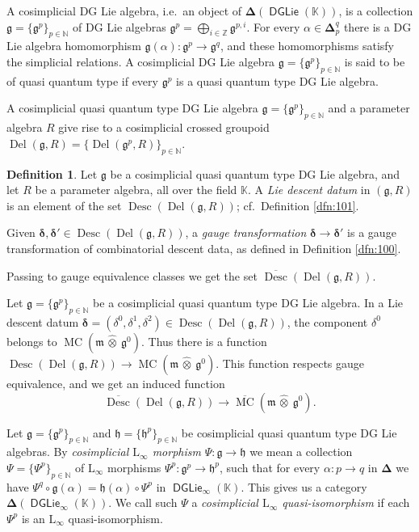 \documentclass[a4paper, 10pt]{amsart}
\theoremstyle{definition}
\newtheorem{dfn}[equation]{Definition}
\numberwithin{equation}{section}
\newcommand{\opn}{\operatorname}
\newcommand{\cat}[1]{\operatorname{\mathsf{#1}}}
\newcommand{\ol}{\overline}
\newcommand{\mfrak}[1]{\mathfrak{#1}}
\newcommand{\mrm}[1]{\mathrm{#1}}
\newcommand{\mbb}[1]{\mathbb{#1}}
\newcommand{\bsym}[1]{\boldsymbol{#1}}
\newcommand{\hatotimes}[1]{\, \what{{\otimes}}_{#1} \,}
\newcommand{\hot}{\hatotimes{}}
\newcommand{\what}[1]{\widehat{#1}}
\newcommand{\K}{\mbb{K}}
\newcommand{\g}{\mfrak{g}}
\newcommand{\m}{\mfrak{m}}
\newcommand{\h}{\mfrak{h}}
\newcommand{\al}{\alpha}
\newcommand{\de}{\delta}
\begin{document}
 A cosimplicial DG Lie algebra, i.e.\ an object of
$\bsym{\Delta}(\cat{DGLie} (\K))$, is  a collection
$\g = \{ \mfrak{g}^{p} \}_{p \in \mbb{N}}$
of DG Lie algebras
$\mfrak{g}^{p} = \bigoplus_{i \in \mbb{Z}} \mfrak{g}^{p, i}$.
For every $\alpha \in \bsym{\Delta}^q_p$
there is a DG Lie algebra homomorphism 
$\g(\alpha) : \mfrak{g}^{p} \to \mfrak{g}^{q}$,
and these homomorphisms satisfy the simplicial relations.
A cosimplicial DG Lie algebra 
$\g = \{ \mfrak{g}^{p} \}_{p \in \mbb{N}}$ is said to be of quasi quantum type
if every $\g^p$ is a  quasi quantum type DG Lie algebra.

A cosimplicial quasi quantum type DG Lie algebra 
$\g = \{ \mfrak{g}^{p} \}_{p \in \mbb{N}}$ and a parameter algebra $R$
give rise to a cosimplicial crossed groupoid 
$\opn{Del}(\g, R) = \bigl\{ \opn{Del}(\g^p, R)  
\bigr\}_{p \in \mbb{N}}$.

\begin{dfn} \label{dfn:Lie-desc.102}
Let $\g$ be a cosimplicial quasi quantum type DG Lie algebra, and let $R$ be a
parameter algebra, all over the field $\K$. 
A {\em Lie descent datum} in $(\g, R)$ is an element of the set 
$\opn{Desc}(\opn{Del}(\g, R))$;
cf.\ Definition \ref{dfn:101}.

Given 
$\bsym{\de}, \bsym{\de}' \in \opn{Desc}(\opn{Del}(\g, R))$,
a {\em gauge transformation} $\bsym{\delta} \to \bsym{\delta}'$ is 
a gauge transformation of combinatorial descent data, as defined in
Definition \ref{dfn:100}.

Passing to gauge equivalence classes we get the set
$\ol{\opn{Desc}}(\opn{Del}(\g, R))$.
\end{dfn}

Let $\g = \{ \mfrak{g}^{p} \}_{p \in \mbb{N}} $ be a cosimplicial quasi quantum
type DG Lie algebra. In a Lie descent datum 
$\bsym{\de} = (\de^0, \de^1, \de^2) \in \opn{Desc}(\opn{Del}(\g, R))$,
the component $\de^0$ belongs to $\opn{MC}(\m \hot \g^0)$.
Thus there is a function 
$\opn{Desc}(\opn{Del}(\g, R)) \to \opn{MC}(\m \hot \g^0)$.
This function respects gauge equivalence, and we get an induced function 
\begin{equation} \label{eqn:Lie-desc.105}
\ol{\opn{Desc}}(\opn{Del}(\g, R)) \to \ol{\opn{MC}}(\m \hot \g^0) .
\end{equation}

Let $\g = \{ \mfrak{g}^{p} \}_{p \in \mbb{N}}$ and 
$\h = \{ \mfrak{h}^{p} \}_{p \in \mbb{N}}$ 
be cosimplicial  quasi quantum type DG Lie algebras. By {\em cosimplicial 
$\mrm{L}_{\infty}$ morphism} 
$\Psi : \g \to \h$ we mean a collection 
$\Psi = \{ \Psi^{p} \}_{p \in \mbb{N}}$
of $\mrm{L}_{\infty}$ morphisms $\Psi^p : \g^p \to \h^p$, 
such that for every $\al : p \to q$ in $\bsym{\Delta}$ we have 
$\Psi^q \circ \g(\al) = \h(\al) \circ \Psi^p$
in $\cat{DGLie}_{\infty}(\K)$.
This gives us a category $\bsym{\Delta}(\cat{DGLie}_{\infty}(\K))$.
We call such $\Psi$ a {\em cosimplicial $\mrm{L}_{\infty}$ quasi-isomorphism} if
each $\Psi^p$ is an $\mrm{L}_{\infty}$ quasi-isomorphism.
\end{document}
